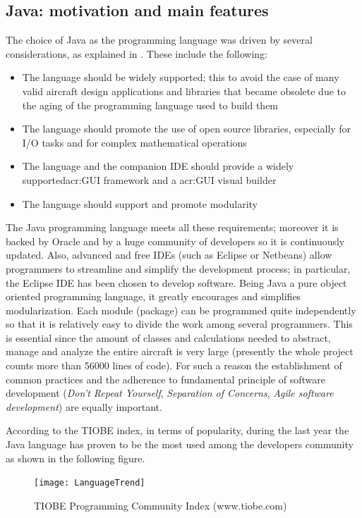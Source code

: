 \subsection{Java: motivation and main features}
The choice of Java as the programming language was driven by several considerations, as explained in \cite{adoptunina}. These include the following:
%
\begin{itemize}
\item The language should be widely supported; this to avoid the case of many valid aircraft design applications and libraries that became obsolete due to the aging of the programming language used to build them
\item The language should promote the use of open source libraries, especially for I/O tasks and for complex mathematical operations
\item The language and the companion \gls{IDE} should provide a widely supported\gls{acr:GUI} framework and a \gls{acr:GUI} visual builder
\item The language should support and promote modularity
\end{itemize}
%
The Java programming language meets all these requirements; moreover it is backed by Oracle and by a huge community of developers so it is continuously updated. Also, advanced and free \gls{IDE}s (such as Eclipse or Netbeans) allow programmers to streamline and simplify the development process; in particular, the Eclipse \gls{IDE} has been chosen to develop software.
%
Being Java a pure object oriented programming language, it greatly encourages and simplifies modularization. Each module (package) can be programmed quite independently so that it is relatively easy to divide the work among several programmers. This is essential since the amount of classes and calculations needed to abstract, manage and analyze the entire aircraft is very large (presently the whole project counts more than 56000 lines of code). For such a reason the establishment of common practices and the adherence to fundamental principle of software development (\emph{Don’t Repeat Yourself}, \emph{Separation of Concerns}, \emph{Agile software development}) are equally important.

\bigskip
\noindent
According to the TIOBE index, in terms of popularity, during the last year the Java language has proven to be the most used among the developers community as shown in the following figure. 
%
\begin{figure}[H]
\centering
\texttt{[image: LanguageTrend]}
\caption{TIOBE Programming Community Index (www.tiobe.com)}
\end{figure}
%
